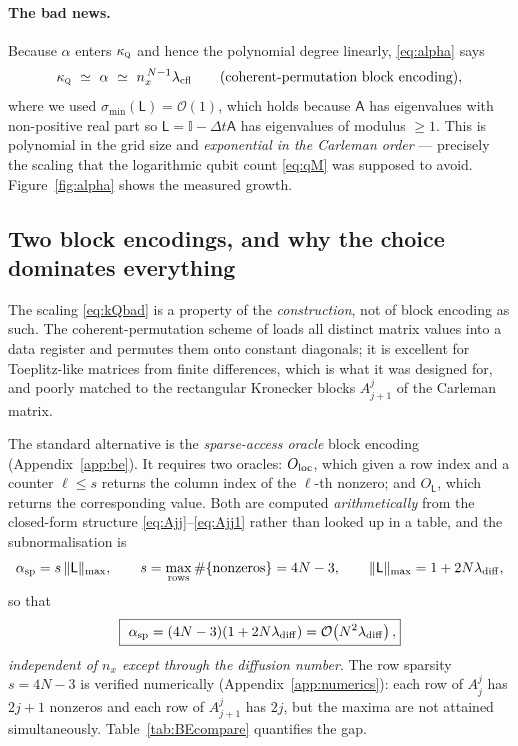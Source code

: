 \documentclass[11pt,a4paper]{article}
\theoremstyle{plain}
\theoremstyle{definition}
\theoremstyle{remark}
\newcommand{\Oh}{\mathcal{O}}
\newcommand{\norm}[1]{\lVert #1 \rVert}
\newcommand{\Id}{\mathbb{I}}
\newcommand{\Lmat}{\mathsf{L}}
\newcommand{\Amat}{\mathsf{A}}
\newcommand{\kQ}{\kappa_{\textsc{q}}}
\begin{document}
\paragraph{The bad news.}  Because $\alpha$ enters $\kQ$ and hence the
polynomial degree linearly, \eqref{eq:alpha} says
\begin{equation}
\kQ\ \simeq\ \alpha\ \simeq\ n_x^{\,N-1}\lambda_{\rm cfl}
\qquad(\text{coherent-permutation block encoding}),
\label{eq:kQbad}
\end{equation}
where we used $\sigma_{\min}(\Lmat)=\Oh(1)$, which holds because $\Amat$ has
eigenvalues with non-positive real part so $\Lmat=\Id-\Delta t\Amat$ has
eigenvalues of modulus $\ge1$.  This is polynomial in the grid size and
\emph{exponential in the Carleman order} --- precisely the scaling that the
logarithmic qubit count \eqref{eq:qM} was supposed to avoid.
Figure~\ref{fig:alpha} shows the measured growth.

\subsection{Two block encodings, and why the choice dominates everything}
\label{sec:two-be}

The scaling \eqref{eq:kQbad} is a property of the \emph{construction}, not of
block encoding as such.  The coherent-permutation scheme of \cite{Setty2025BE}
loads all distinct matrix values into a data register and permutes them onto
constant diagonals; it is excellent for Toeplitz-like matrices from finite
differences, which is what it was designed for, and poorly matched to the
rectangular Kronecker blocks $A^j_{j+1}$ of the Carleman matrix.

The standard alternative is the \emph{sparse-access oracle} block encoding
(Appendix~\ref{app:be}).  It requires two oracles: $O_{\rm loc}$, which given a
row index and a counter $\ell\le s$ returns the column index of the $\ell$-th
nonzero; and $O_{\Lmat}$, which returns the corresponding value.  Both are
computed \emph{arithmetically} from the closed-form structure
\eqref{eq:Ajj}--\eqref{eq:Ajj1} rather than looked up in a table, and the
subnormalisation is
\begin{equation}
\alpha_{\rm sp}=s\,\norm{\Lmat}_{\max},
\qquad
s=\max_{\rm rows}\#\{\text{nonzeros}\}=4N-3,
\qquad
\norm{\Lmat}_{\max}=1+2N\lambda_{\rm diff},
\label{eq:alphasp}
\end{equation}
so that
\begin{equation}
\boxed{\ \alpha_{\rm sp}=(4N-3)(1+2N\lambda_{\rm diff})=\Oh\!\left(N^{2}\lambda_{\rm diff}\right),}
\label{eq:kQgood}
\end{equation}
\emph{independent of $n_x$ except through the diffusion number}.  The row
sparsity $s=4N-3$ is verified numerically (Appendix~\ref{app:numerics}): each row
of $A^j_j$ has $2j+1$ nonzeros and each row of $A^j_{j+1}$ has $2j$, but the
maxima are not attained simultaneously.  Table~\ref{tab:BEcompare} quantifies
the gap.
\end{document}
